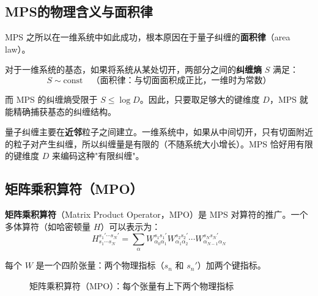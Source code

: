 \documentclass[12pt,a4paper]{ctexart}
\begin{document}
\subsection{MPS的物理含义与面积律}

MPS 之所以在一维系统中如此成功，根本原因在于量子纠缠的\textbf{面积律}（area law）。

对于一维系统的基态，如果将系统从某处切开，两部分之间的\textbf{纠缠熵} $S$ 满足：
\begin{equation}
    S \sim \text{const}  \quad \text{（面积律：与切面面积成正比，一维时为常数）}
\end{equation}

而 MPS 的纠缠熵受限于 $S \leq \log D$。因此，只要取足够大的键维度 $D$，MPS 就能精确捕获基态的纠缠结构。

\begin{keybox}[面积律的直觉解释]
量子纠缠主要在\textbf{近邻}粒子之间建立。一维系统中，如果从中间切开，只有切面附近的粒子对产生纠缠，所以纠缠量是有限的（不随系统大小增长）。MPS 恰好用有限的键维度 $D$ 来编码这种"有限纠缠"。
\end{keybox}

\subsection{矩阵乘积算符（MPO）}

\textbf{矩阵乘积算符}（Matrix Product Operator，MPO）是 MPS 对算符的推广。一个多体算符（如哈密顿量 $H$）可以表示为：
\begin{equation}
    H_{s_1\cdots s_N}^{s_1'\cdots s_N'} = \sum_{\alpha} W^{s_1 s_1'}_{\alpha_0 \alpha_1} W^{s_2 s_2'}_{\alpha_1 \alpha_2} \cdots W^{s_N s_N'}_{\alpha_{N-1} \alpha_N}
\end{equation}

每个 $W$ 是一个四阶张量：两个物理指标（$s_n$ 和 $s_n'$）加两个键指标。

\begin{figure}[H]
\centering
{}
\caption{矩阵乘积算符（MPO）：每个张量有上下两个物理指标}
\end{figure}
\end{document}
